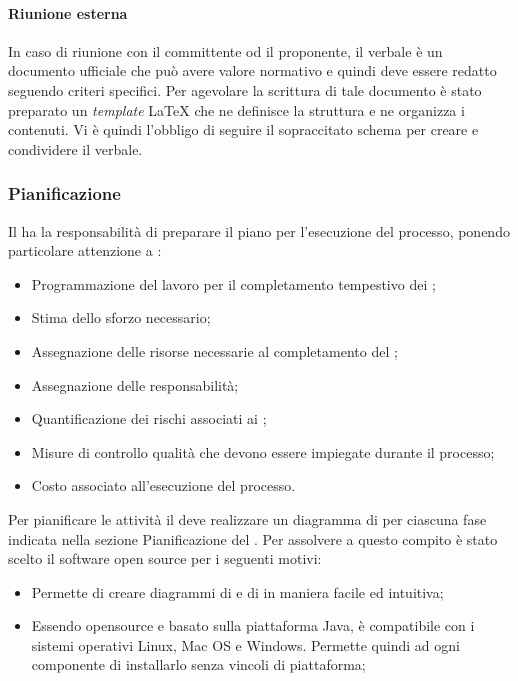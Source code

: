 \documentclass[12pt,a4paper]{article}
\begin{document}
\paragraph{Riunione esterna}
In caso di riunione con il committente od il proponente, il verbale è un documento ufficiale che può avere valore normativo e quindi deve essere redatto seguendo criteri specifici.
Per agevolare la scrittura di tale documento è stato preparato un \emph{template} \LaTeX{} che ne definisce la struttura e ne organizza i contenuti. Vi è quindi l'obbligo di seguire il sopraccitato schema per creare e condividere il verbale.
\subsubsection{Pianificazione}\label{Pianificazione} %
Il \PM{} ha la responsabilità di preparare il piano per l'esecuzione del processo, ponendo particolare attenzione a :
\begin{itemize}
  \item Programmazione del lavoro per il completamento tempestivo dei ;
  \item Stima dello sforzo necessario;
  \item Assegnazione delle risorse necessarie al completamento del ;
  \item Assegnazione delle responsabilità;
  \item Quantificazione dei rischi associati ai ;
  \item Misure di controllo qualità che devono essere impiegate durante il processo;
  \item Costo associato all'esecuzione del processo.
\end{itemize}

Per pianificare le attività il \PM{} deve realizzare un diagramma di \textit{} per ciascuna fase indicata nella sezione Pianificazione del \PdP{}.
Per assolvere a questo compito è stato scelto il software open source \textit{} per i seguenti motivi:
\begin{itemize}
  \item Permette di creare diagrammi di \textit{} e di \textit{} in maniera facile ed intuitiva;
  \item Essendo opensource e basato sulla piattaforma Java, è compatibile con i sistemi operativi Linux, Mac OS e Windows. Permette quindi ad ogni componente di installarlo senza vincoli di piattaforma;
\end{itemize}
\end{document}
